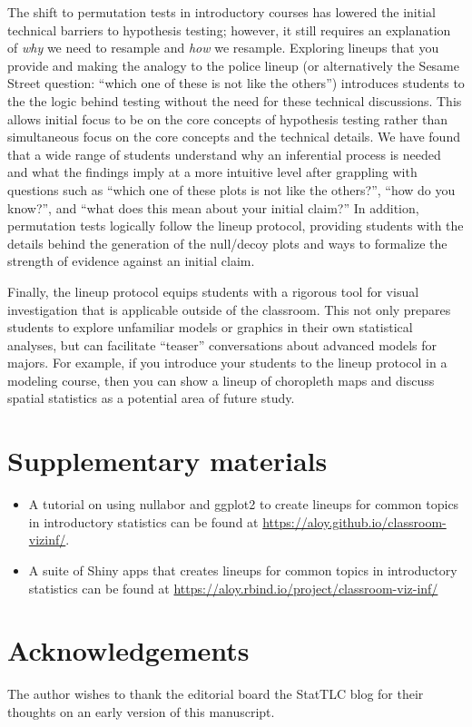 \documentclass[12pt]{article}
\begin{document}
The shift to permutation tests in introductory courses has lowered the
initial technical barriers to hypothesis testing; however, it still
requires an explanation of \emph{why} we need to resample and \emph{how}
we resample. Exploring lineups that you provide and making the analogy
to the police lineup (or alternatively the Sesame Street question:
``which one of these is not like the others'') introduces students to
the the logic behind testing without the need for these technical
discussions. This allows initial focus to be on the core concepts of
hypothesis testing rather than simultaneous focus on the core concepts
and the technical details. We have found that a wide range of students
understand why an inferential process is needed and what the findings
imply at a more intuitive level after grappling with questions such as
``which one of these plots is not like the others?'', ``how do you
know?'', and ``what does this mean about your initial claim?'' In
addition, permutation tests logically follow the lineup protocol,
providing students with the details behind the generation of the
null/decoy plots and ways to formalize the strength of evidence against
an initial claim.

Finally, the lineup protocol equips students with a rigorous tool for
visual investigation that is applicable outside of the classroom. This
not only prepares students to explore unfamiliar models or graphics in
their own statistical analyses, but can facilitate ``teaser''
conversations about advanced models for majors. For example, if you
introduce your students to the lineup protocol in a modeling course,
then you can show a lineup of choropleth maps and discuss spatial
statistics as a potential area of future study.

\section*{Supplementary materials}

\begin{itemize}
\item
  A tutorial on using nullabor and ggplot2 to create lineups for common
  topics in introductory statistics can be found at
  \url{https://aloy.github.io/classroom-vizinf/}.
\item
  A suite of Shiny apps that creates lineups for common topics in
  introductory statistics can be found at
  \url{https://aloy.rbind.io/project/classroom-viz-inf/}
\end{itemize}

\section*{Acknowledgements}

The author wishes to thank the editorial board the StatTLC blog for
their thoughts on an early version of this manuscript.



\end{document}

